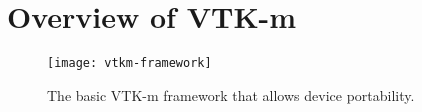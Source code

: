 \section{Overview of VTK-m}


\cite{Moreland2016}

\begin{figure}[htb]
  \texttt{[image: vtkm-framework]}
  \caption{The basic VTK-m framework that allows device portability.}
  \label{fig:vtkm-framework}
\end{figure}

